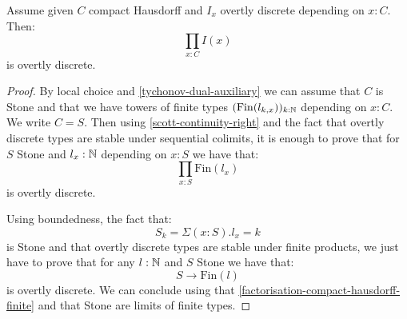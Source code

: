 \begin{theorem}\label{tychonov-dual}
Assume given $C$ compact Hausdorff and $I_x$ overtly discrete depending on $x:C$. Then:
\[\prod_{x:C}I(x)\]
is overtly discrete.
\end{theorem}

\begin{proof}
By local choice and \cref{tychonov-dual-auxiliary} we can assume that $C$ is Stone and that we have towers of finite types $(\mathrm{Fin}(l_{k,x}))_{k:\mathbb{N}}$ depending on $x:C$. We write $C=S$. Then using \cref{scott-continuity-right} and the fact that overtly discrete types are stable under sequential colimits, it is enough to prove that for $S$ Stone and $l_x:\mathbb{N}$ depending on $x:S$ we have that:
\[\prod_{x:S}\mathrm{Fin}(l_{x})\]
is overtly discrete. 

Using boundedness, the fact that:
\[S_k = \Sigma(x:S). l_x = k\] 
is Stone and that overtly discrete types are stable under finite products, we just have to prove that for any $l:\mathbb{N}$ and $S$ Stone we have that:
\[S\to \mathrm{Fin}(l)\]
is overtly discrete. We can conclude using that \cref{factorisation-compact-hausdorff-finite} and that Stone are limits of finite types.
\end{proof}



